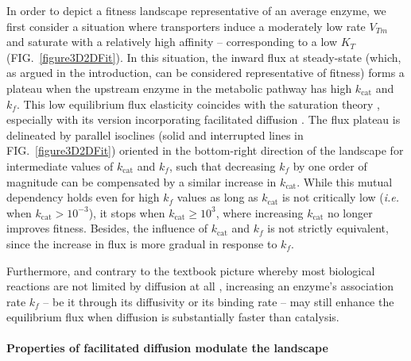 In order to depict a fitness landscape representative of an average enzyme, we first consider a situation where transporters induce a moderately low rate $V_{Tm}$ and saturate with a relatively high affinity -- corresponding to a low $K_T$ (FIG.~\ref{figure3D2DFit}). In this situation, the inward flux at steady-state (which, as argued in the introduction, can be considered representative of fitness) forms a plateau when the upstream enzyme in the metabolic pathway has high $k_\text{cat}$ and $k_f$. This low equilibrium flux elasticity coincides with the saturation theory \citep{Wright34, Kacser73,Hartl85,Dykhuizen87,Dean95,Yi19}, especially with its version incorporating facilitated diffusion \citep{Kuile94,Dean95}. The flux plateau is delineated by parallel isoclines (solid and interrupted lines in FIG.~\ref{figure3D2DFit}) oriented in the bottom-right direction of the landscape for intermediate values of $k_\text{cat}$ and $k_f$, such that decreasing $k_f$ by one order of magnitude can be compensated by a similar increase in $k_\text{cat}$. While this mutual dependency holds even for high $k_f$ values as long as $k_\text{cat}$ is not critically low (\textit{i.e.} when $k_\text{cat}>10^{-3}$), it stops when $k_\text{cat}\geq 10^3$, where increasing $k_\text{cat}$ no longer improves fitness. 
Besides, the influence of $k_\text{cat}$ and $k_f$ is not strictly equivalent, since the increase in flux is more gradual in response to $k_f$. 
 
Furthermore, and contrary to the textbook picture whereby most biological reactions are not limited by diffusion at all \citep{Bar-Even11,Sweetlove18}, increasing an enzyme's association rate $k_f$ – be it through its diffusivity or its binding rate – may still enhance the equilibrium flux when diffusion is substantially faster than catalysis.

\noindent \paragraph{Properties of facilitated diffusion modulate the landscape}

